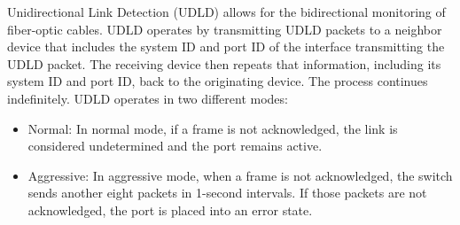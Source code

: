 \documentclass{article}
\begin{document}
	Unidirectional Link Detection (UDLD) allows for the bidirectional monitoring of fiber-optic cables. UDLD operates by transmitting UDLD packets to a neighbor device that includes the system ID and port ID of the interface transmitting the UDLD packet. The receiving device then repeats that information, including its system ID and port ID, back to the originating device. The process continues indefinitely. UDLD operates in two different modes:
\begin{itemize}
\item Normal: In normal mode, if a frame is not acknowledged, the link is considered undetermined and the port remains active.
\item Aggressive: In aggressive mode, when a frame is not acknowledged, the switch sends another eight packets in 1-second intervals. If those packets are not acknowledged, the port is placed into an error state.
\end{itemize}
\end{document}
